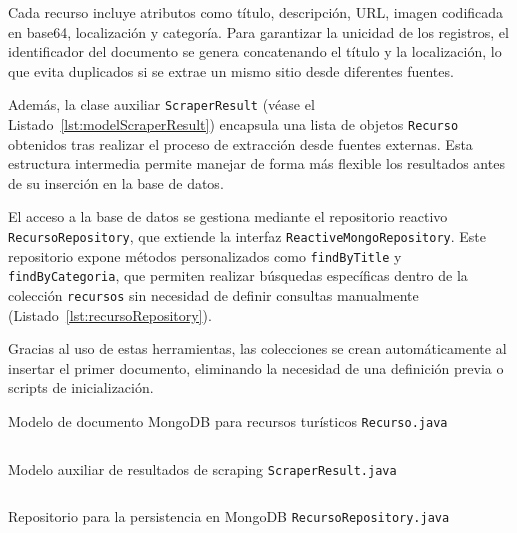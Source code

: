 Cada recurso incluye atributos como título, descripción, URL, imagen codificada en base64, localización y categoría. Para garantizar la unicidad de los registros, el identificador del documento se genera concatenando el título y la localización, lo que evita duplicados si se extrae un mismo sitio desde diferentes fuentes.

Además, la clase auxiliar \texttt{ScraperResult} (véase el Listado~\ref{lst:modelScraperResult}) encapsula una lista de objetos \texttt{Recurso} obtenidos tras realizar el proceso de extracción desde fuentes externas. Esta estructura intermedia permite manejar de forma más flexible los resultados antes de su inserción en la base de datos.

El acceso a la base de datos se gestiona mediante el repositorio reactivo \texttt{RecursoRepository}, que extiende la interfaz \texttt{ReactiveMongoRepository}. Este repositorio expone métodos personalizados como \texttt{findByTitle} y \texttt{findByCategoria}, que permiten realizar búsquedas específicas dentro de la colección \texttt{recursos} sin necesidad de definir consultas manualmente (Listado~\ref{lst:recursoRepository}).

Gracias al uso de estas herramientas, las colecciones se crean automáticamente al insertar el primer documento, eliminando la necesidad de una definición previa o scripts de inicialización.

\begin{longlisting} \caption{Modelo de documento MongoDB para recursos turísticos {\tt Recurso.java}} \inputminted[firstline=6,lastline=78]{java}{../backend/extraccion/extraccion/src/main/java/es/uv/hemal/extraccion/extraccion/models/Recurso.java} \label{lst:modelRecurso} \end{longlisting}

\begin{longlisting} \caption{Modelo auxiliar de resultados de scraping {\tt ScraperResult.java}} \inputminted[firstline=6,lastline=33]{java}{../backend/extraccion/extraccion/src/main/java/es/uv/hemal/extraccion/extraccion/models/ScraperResult.java} \label{lst:modelScraperResult} \end{longlisting}

\begin{longlisting} 
  \caption{Repositorio para la persistencia en MongoDB {\tt RecursoRepository.java}} 
  \inputminted[firstline=5,lastline=13]{java}{../backend/extraccion/extraccion/src/main/java/es/uv/hemal/extraccion/extraccion/repositories/RecursoRepository.java} \label{lst:recursoRepository} \end{longlisting}
